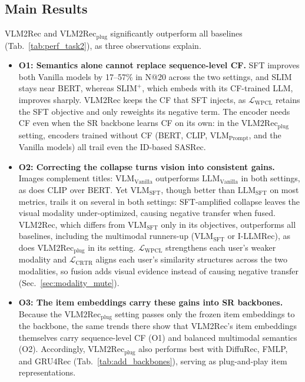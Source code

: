 \subsection{Main Results}
\label{sec:exp_main}
VLM2Rec and $\text{VLM2Rec}_{\text{plug}}$ significantly outperform all baselines (Tab.~\ref{tab:perf_task2}), as three observations explain.

\begin{itemize}[wide=0pt]
    \item \textbf{O1: Semantics alone cannot replace sequence-level CF.}
    SFT improves both Vanilla models by 17--57\% in N@20 across the two settings, and SLIM stays near BERT, whereas $\text{SLIM}^{+}$, which embeds with its CF-trained LLM, improves sharply.
    VLM2Rec keeps the CF that SFT injects, as $\mathcal{L}_{\text{WPCL}}$ retains the SFT objective and only reweights its negative term.
    The encoder needs CF even when the SR backbone learns CF on its own: in the $\text{VLM2Rec}_{\text{plug}}$ setting, encoders trained without CF (BERT, CLIP, $\text{VLM}_{\text{Prompt}}$, and the Vanilla models) all trail even the ID-based SASRec.
    \item \textbf{O2: Correcting the collapse turns vision into consistent gains.}
    Images complement titles: $\text{VLM}_{\text{Vanilla}}$ outperforms $\text{LLM}_{\text{Vanilla}}$ in both settings, as does CLIP over BERT.
    Yet $\text{VLM}_{\text{SFT}}$, though better than $\text{LLM}_{\text{SFT}}$ on most metrics, trails it on several in both settings: SFT-amplified collapse leaves the visual modality under-optimized, causing negative transfer when fused.
    VLM2Rec, which differs from $\text{VLM}_{\text{SFT}}$ only in its objectives, outperforms all baselines, including the multimodal runners-up ($\text{VLM}_{\text{SFT}}$ or I-LLMRec), as does $\text{VLM2Rec}_{\text{plug}}$ in its setting.
    $\mathcal{L}_{\text{WPCL}}$ strengthens each user's weaker modality and $\mathcal{L}_{\text{CRTR}}$ aligns each user's similarity structures across the two modalities, so fusion adds visual evidence instead of causing negative transfer (Sec.~\ref{sec:modality_mute}).
    \item \textbf{O3: The item embeddings carry these gains into SR backbones.}
    Because the $\text{VLM2Rec}_{\text{plug}}$ setting passes only the frozen item embeddings to the backbone, the same trends there show that VLM2Rec's item embeddings themselves carry sequence-level CF (O1) and balanced multimodal semantics (O2).
    Accordingly, $\text{VLM2Rec}_{\text{plug}}$ also performs best with DiffuRec, FMLP, and GRU4Rec (Tab.~\ref{tab:add_backbones}), serving as plug-and-play item representations.
\end{itemize}


